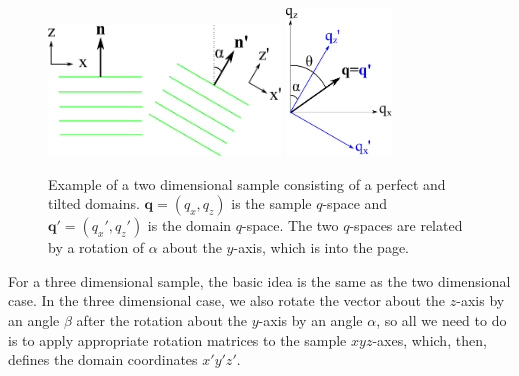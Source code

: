 \begin{figure}
  \centering
  \includegraphics[width=0.55\textwidth]{figures/ripple/mosaic/mosaic_2D}
  \quad\quad
  \includegraphics[width=0.25\textwidth]{figures/ripple/mosaic/mosaic_2Dqspace}
  \caption{Example of a two dimensional sample consisting of a perfect 
  and tilted domains. $\mathbf{q} = (q_x,q_z)$ is the sample $q$-space and
  $\mathbf{q'} = (q_x',q_z')$ is the domain $q$-space. The two $q$-spaces
  are related by a rotation of $\alpha$ about the $y$-axis, which is into 
  the page.}
  \label{fig:mosaic_2D}
\end{figure}

For a three dimensional sample, the basic idea is the same as the two 
dimensional case. In the three dimensional case, we also rotate the vector
about the $z$-axis by an angle $\beta$ after the rotation about the $y$-axis
by an angle $\alpha$, so
all we need to do is to apply appropriate rotation matrices to
the sample $xyz$-axes, which, then, defines the domain coordinates $x'y'z'$.

